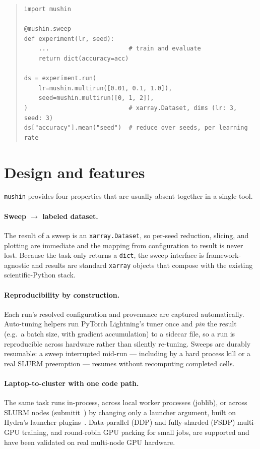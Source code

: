 \documentclass[11pt]{article}
\begin{document}
\begin{quote}
\begin{verbatim}
import mushin

@mushin.sweep
def experiment(lr, seed):
    ...                      # train and evaluate
    return dict(accuracy=acc)

ds = experiment.run(
    lr=mushin.multirun([0.01, 0.1, 1.0]),
    seed=mushin.multirun([0, 1, 2]),
)                            # xarray.Dataset, dims (lr: 3, seed: 3)
ds["accuracy"].mean("seed")  # reduce over seeds, per learning rate
\end{verbatim}
\end{quote}

\section{Design and features}

\texttt{mushin} provides four properties that are usually absent together in a
single tool.

\paragraph{Sweep $\rightarrow$ labeled dataset.}
The result of a sweep is an \texttt{xarray.Dataset}, so per-seed reduction,
slicing, and plotting are immediate and the mapping from configuration to result
is never lost. Because the task only returns a \texttt{dict}, the sweep interface
is framework-agnostic and results are standard \texttt{xarray} objects that
compose with the existing scientific-Python stack.

\paragraph{Reproducibility by construction.}
Each run's resolved configuration and provenance are captured automatically.
Auto-tuning helpers run PyTorch Lightning's tuner once and \emph{pin} the result
(e.g.\ a batch size, with gradient accumulation) to a sidecar file, so a run is
reproducible across hardware rather than silently re-tuning. Sweeps are durably
resumable: a sweep interrupted mid-run --- including by a hard process kill or a
real SLURM preemption --- resumes without recomputing completed cells.

\paragraph{Laptop-to-cluster with one code path.}
The same task runs in-process, across local worker processes (joblib), or across
SLURM nodes (submitit~\citep{submitit2021}) by changing only a launcher argument,
built on Hydra's launcher plugins~\citep{yadan2019hydra}. Data-parallel (DDP) and
fully-sharded (FSDP) multi-GPU training, and round-robin GPU packing for small
jobs, are supported and have been validated on real multi-node GPU hardware.
\end{document}
